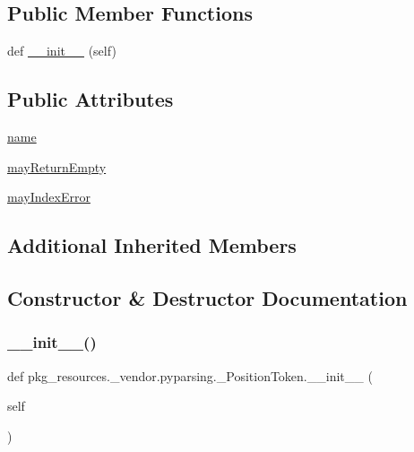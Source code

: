 \subsection*{Public Member Functions}
\begin{DoxyCompactItemize}
\item 
def \hyperlink{classpkg__resources_1_1__vendor_1_1pyparsing_1_1__PositionToken_a08f2f32d2574e109ba2cedaad6ec8073}{\+\_\+\+\_\+init\+\_\+\+\_\+} (self)
\end{DoxyCompactItemize}
\subsection*{Public Attributes}
\begin{DoxyCompactItemize}
\item 
\hyperlink{classpkg__resources_1_1__vendor_1_1pyparsing_1_1__PositionToken_aedebcf41a82fdb7609c96affdfc4c94c}{name}
\item 
\hyperlink{classpkg__resources_1_1__vendor_1_1pyparsing_1_1__PositionToken_a2729082829d0e4ea85fdd5597b5550d8}{may\+Return\+Empty}
\item 
\hyperlink{classpkg__resources_1_1__vendor_1_1pyparsing_1_1__PositionToken_a37791b417a2b6be1ab1a9ab6c23cf32a}{may\+Index\+Error}
\end{DoxyCompactItemize}
\subsection*{Additional Inherited Members}


\subsection{Constructor \& Destructor Documentation}
\mbox{\label{classpkg__resources_1_1__vendor_1_1pyparsing_1_1__PositionToken_a08f2f32d2574e109ba2cedaad6ec8073}} 
\subsubsection{\texorpdfstring{\+\_\+\+\_\+init\+\_\+\+\_\+()}{\_\_init\_\_()}}
{\footnotesize\ttfamily def pkg\+\_\+resources.\+\_\+vendor.\+pyparsing.\+\_\+\+Position\+Token.\+\_\+\+\_\+init\+\_\+\+\_\+ (\begin{DoxyParamCaption}\item[{}]{self }\end{DoxyParamCaption})}



